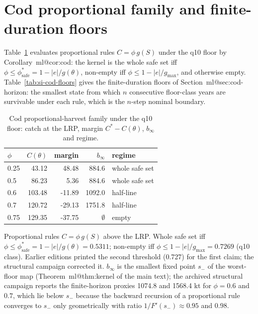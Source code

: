 \documentclass[11pt,a4paper]{article}
\makeatletter
\newcommand{\LRP}{\theta}
\newcommand{\gmax}{g_{\max}}
\newcommand{\mref}[1]{\csname ml@#1\endcsname}
\makeatother
\begin{document}
\section{Cod proportional family and finite-duration floors}\label{si:cod-family}
Table~\ref{tab:si-family} evaluates proportional rules $C=\phi\,g(S)$ under the q10 floor by Corollary~\mref{cor:cod}: the kernel is the whole safe set iff $\phi\le\phi^*_{\mathrm{safe}}=1-|e|/g(\LRP)$, non-empty iff $\phi\le1-|e|/\gmax$, and otherwise empty. Table~\ref{tab:si-cod-floors} gives the finite-duration floors of Section~\mref{sec:cod-horizon}: the smallest state from which $n$ consecutive floor-class years are survivable under each rule, which is the $n$-step nominal boundary.
\begin{table}[H]
\centering
\caption{Cod proportional-harvest family under the q10 floor: catch at the LRP, margin $C^*-C(\theta)$, $b_\infty$ and regime.}
\label{tab:si-family}
\small
\begin{tabular}{lrrrl}
\toprule
$\phi$ & $C(\theta)$ & margin & $b_\infty$ & regime \\
\midrule
0.25 & 43.12 & 48.48 & 884.6 & whole safe set \\
0.5 & 86.23 & 5.36 & 884.6 & whole safe set \\
0.6 & 103.48 & -11.89 & 1092.0 & half-line \\
0.7 & 120.72 & -29.13 & 1751.8 & half-line \\
0.75 & 129.35 & -37.75 & $\emptyset$ & empty \\
\bottomrule
\end{tabular}
\par\smallskip\begin{minipage}{0.97\linewidth}\footnotesize Proportional rules $C=\phi\,g(S)$ above the LRP. Whole safe set iff $\phi\le\phi^*_{\mathrm{safe}}=1-|e|/g(\theta)=0.5311$; non-empty iff $\phi\le 1-|e|/g_{\max}=0.7269$ (q10 class). Earlier editions printed the second threshold (0.727) for the first claim; the structural campaign corrected it. $b_\infty$ is the smallest fixed point $s_-$ of the worst-floor map (Theorem~\mref{thm:kernel} of the main text); the archived structural campaign reports the finite-horizon proxies 1074.8 and 1568.4 kt for $\phi=0.6$ and $0.7$, which lie below $s_-$ because the backward recursion of a proportional rule converges to $s_-$ only geometrically with ratio $1/F'(s_-)\approx0.95$ and $0.98$.\end{minipage}
\end{table}
\end{document}
